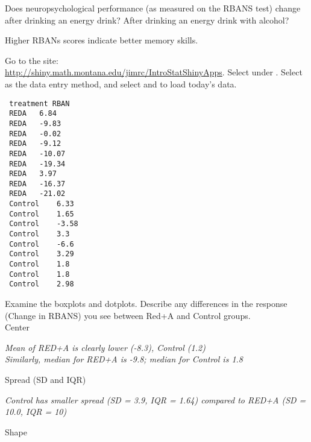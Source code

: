 \begin{enumerate}
  {\sf
    Does neuropsychological performance (as measured on the RBANS
    test) change after drinking an energy drink?  After drinking an
    energy drink with alcohol? }

   Higher RBANs scores indicate better memory skills. 

Go to the site:\\
  \url{http://shiny.math.montana.edu/jimrc/IntroStatShinyApps}. 
  Select  under . Select  as the data entry method, and
  select  and  to load today's
  data. 
 
 \begin{fmpage}{.3\linewidth}
 {\footnotesize
 \begin{verbatim}
 treatment RBAN
 REDA	6.84
 REDA	-9.83
 REDA	-0.02
 REDA	-9.12
 REDA	-10.07
 REDA	-19.34
 REDA	3.97
 REDA	-16.37
 REDA	-21.02
 Control	6.33
 Control	1.65
 Control	-3.58
 Control	3.3
 Control	-6.6
 Control	3.29
 Control	1.8
 Control	1.8
 Control	2.98
 \end{verbatim}
 }
 \end{fmpage}
 \hfill
 \begin{minipage}{.6\linewidth}

   Examine the boxplots and dotplots. Describe any differences in the
   response (Change in RBANS) you see  between Red+A and Control groups. \\

   Center
\begin{students}
    \vspace{1.4cm}    
\end{students}

\begin{key}
  {\it Mean of RED+A is clearly  lower (-8.3), Control  (1.2)\\
  Similarly, median for RED+A is -9.8; median for Control is 1.8 }
\end{key}

   Spread  (SD and IQR)
\begin{students}
    \vspace{1.4cm}    
\end{students}

\begin{key}
  {\it      Control has smaller spread (SD = 3.9, IQR = 1.64)
     compared to  RED+A (SD = 10.0, IQR = 10) 
}
\end{key}


   Shape
\begin{students}
    \vspace{1.4cm}    
\end{students}


\end{minipage}
\end{enumerate}
